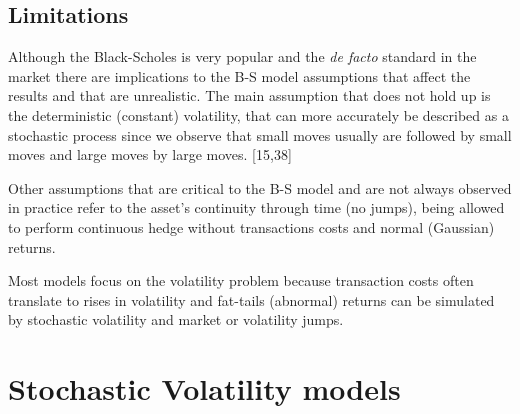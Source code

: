 \documentclass[12pt,twoside]{reedthesis}
\theoremstyle{definition}
\theoremstyle{definition}
\theoremstyle{remark}
\begin{document}
  \subsection{Limitations}\label{limitations}
  
  Although the Black-Scholes is very popular and the \emph{de facto}
  standard in the market there are implications to the B-S model
  assumptions that affect the results and that are unrealistic. The main
  assumption that does not hold up is the deterministic (constant)
  volatility, that can more accurately be described as a stochastic
  process since we observe that small moves usually are followed by small
  moves and large moves by large moves. {[}15,38{]}
  
  Other assumptions that are critical to the B-S model and are not always
  observed in practice refer to the asset's continuity through time (no
  jumps), being allowed to perform continuous hedge without transactions
  costs and normal (Gaussian) returns.
  
  Most models focus on the volatility problem because transaction costs
  often translate to rises in volatility and fat-tails (abnormal) returns
  can be simulated by stochastic volatility and market or volatility
  jumps.
  
  \section{Stochastic Volatility
  models}\label{stochastic-volatility-models}
  
\end{document}
